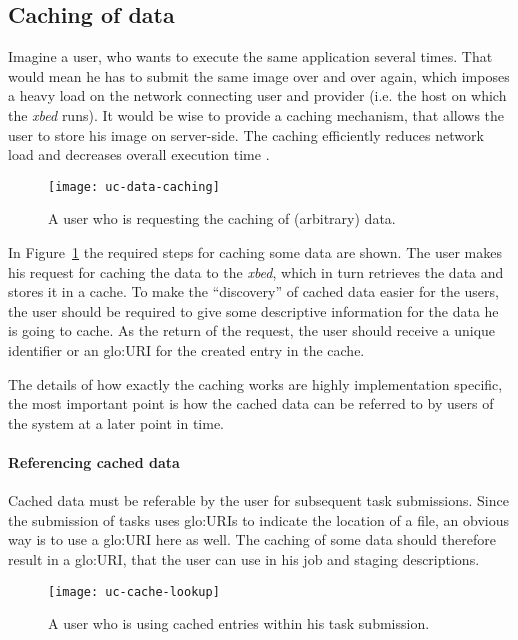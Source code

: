 \subsection{Caching of data}
\label{sec:uc-data-caching}

Imagine a user,  who wants to execute the  same application several times.
That would mean he has to submit the same image over and over again, which
imposes a heavy load on the network connecting user and provider (i.e. the
host on which the \emph{xbed} runs). It would be wise to provide a caching
mechanism, that  allows the  user to store  his image on  server-side. The
caching efficiently  reduces network load and  decreases overall execution
time \cite{locality-principle}.

\begin{figure}[h]
  \centering
  \texttt{[image: uc-data-caching]}
  \caption[UC  Data  Caching]{A user  who  is  requesting  the caching  of
    (arbitrary) data.}
  \label{fig:uc-data-caching}
\end{figure}

In  Figure~\ref{fig:uc-data-caching} the required  steps for  caching some
data are  shown. The user  makes his request  for caching the data  to the
\emph{xbed}, which in turn retrieves the data and stores it in a cache. To
make  the ``discovery''  of cached  data easier  for the  users,  the user
should be required to give some descriptive information for the data he is
going to  cache. As the return of  the request, the user  should receive a
unique identifier or an \gls{glo:URI} for the created entry in the cache.

The details  of how  exactly the caching  works are  highly implementation
specific, the most important point is  how the cached data can be referred
to by users of the system at a later point in time.

\paragraph{Referencing cached  data}

Cached data must be referable by the user for subsequent task submissions.
Since the submission of tasks uses \gls{glo:URI}s to indicate the location
of a  file, an obvious  way is  to use a  \gls{glo:URI} here as  well. The
caching of some data should  therefore result in a \gls{glo:URI}, that the
user can use in his job and staging descriptions.

\begin{figure}[h]
  \centering
  \texttt{[image: uc-cache-lookup]}
  \caption[UC  Cache Lookup]{A user  who  is using cached entries within
    his task submission.}
  \label{fig:uc-cache-lookup}
\end{figure}

